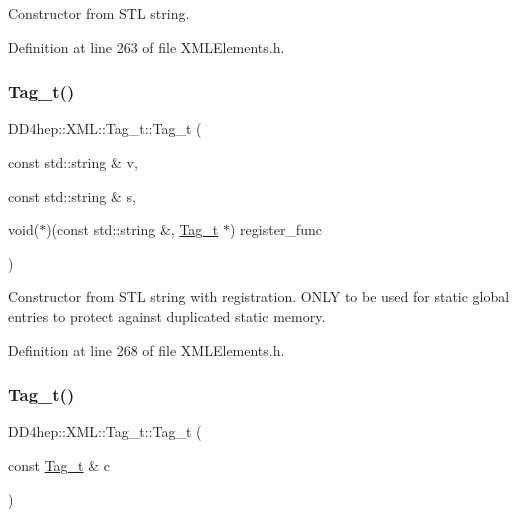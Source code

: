 Constructor from S\+TL string. 



Definition at line 263 of file X\+M\+L\+Elements.\+h.

\hypertarget{class_d_d4hep_1_1_x_m_l_1_1_tag__t_a852d3feade27fadfa267798e8e417b80}{}\label{class_d_d4hep_1_1_x_m_l_1_1_tag__t_a852d3feade27fadfa267798e8e417b80} 
\subsubsection{\texorpdfstring{Tag\+\_\+t()}{Tag\_t()}\hspace{0.1cm}{\footnotesize\ttfamily [5/6]}}
{\footnotesize\ttfamily D\+D4hep\+::\+X\+M\+L\+::\+Tag\+\_\+t\+::\+Tag\+\_\+t (\begin{DoxyParamCaption}\item[{const std\+::string \&}]{v,  }\item[{const std\+::string \&}]{s,  }\item[{void($\ast$)(const std\+::string \&, \hyperlink{class_d_d4hep_1_1_x_m_l_1_1_tag__t}{Tag\+\_\+t} $\ast$)}]{register\+\_\+func }\end{DoxyParamCaption})\hspace{0.3cm}{\ttfamily [inline]}}

Constructor from S\+TL string with registration. O\+N\+LY to be used for static global entries to protect against duplicated static memory. 

Definition at line 268 of file X\+M\+L\+Elements.\+h.

\hypertarget{class_d_d4hep_1_1_x_m_l_1_1_tag__t_a098fcb4e75ad5b52a8f02e10e5672ad9}{}\label{class_d_d4hep_1_1_x_m_l_1_1_tag__t_a098fcb4e75ad5b52a8f02e10e5672ad9} 
\subsubsection{\texorpdfstring{Tag\+\_\+t()}{Tag\_t()}\hspace{0.1cm}{\footnotesize\ttfamily [6/6]}}
{\footnotesize\ttfamily D\+D4hep\+::\+X\+M\+L\+::\+Tag\+\_\+t\+::\+Tag\+\_\+t (\begin{DoxyParamCaption}\item[{const \hyperlink{class_d_d4hep_1_1_x_m_l_1_1_tag__t}{Tag\+\_\+t} \&}]{c }\end{DoxyParamCaption})\hspace{0.3cm}{\ttfamily [inline]}}



